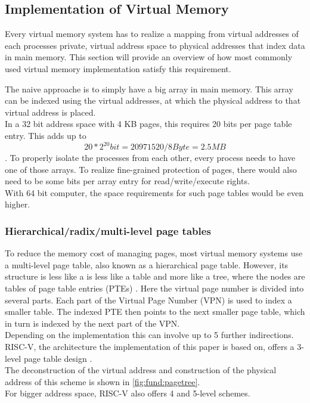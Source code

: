 
\subsection{Implementation of Virtual Memory}
Every virtual memory system has to realize a mapping from virtual addresses of each processes
private, virtual address space to physical addresses that index data in main memory.
This section will provide an overview of how most commonly used virtual memory implementation satisfy
this requirement.


The naive approache is to simply have a big array in main memory. This array can be indexed
using the virtual addresses, at which the physical address to that virtual address is placed.\\
In a 32 bit address space with 4 KB pages, this requires 20 bits per page table entry. This
adds up to \[ 20 * 2^{20} bit = 20971520 / 8 Byte = 2.5 MB \].
To properly isolate the processes from each other, every process needs to have one of those arrays.
To realize fine-grained protection of pages, there would also need to be some bits per array entry
for read/write/execute rights.\\
With 64 bit computer, the space requirements for such page tables would be even higher.

\subsubsection{Hierarchical/radix/multi-level page tables}
To reduce the memory cost of managing pages, most  virtual memory systems use a
multi-level page table, also known as a hierarchical page table. However, its structure is less like a
is less like a table and more like a tree, where the nodes are tables of page table entries (PTEs) \cite{tanenbaumOS}.
Here the virtual page number is divided into several parts. Each part of the Virtual Page Number (VPN)
is used to index a smaller table. The indexed PTE then points to the next smaller page table,
which in turn is indexed by the next part of the VPN.\\Depending on the implementation
this can involve up to 5 further indirections.\\
RISC-V, the architecture the implementation of this paper is based on, offers a 3-level page table
design \cite{riscvreader}.\\
The deconstruction of the virtual address and construction of the physical address of this
scheme is shown in \ref{fig:fund:pagetree}.\\
For bigger address space, RISC-V also offers 4 and 5-level schemes.


